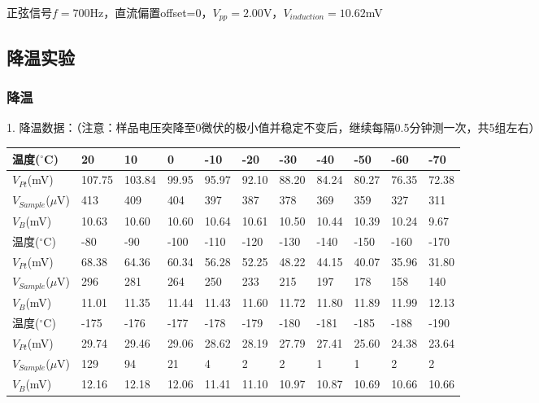 \documentclass[UTF8]{ctexart}
\begin{document}
    正弦信号$f=700$Hz，直流偏置offset=0，$V_{pp}=2.00$V，$V_{induction}=10.62$mV

    \subsection{降温实验}

    \subsubsection{降温}

    1. 降温数据：（注意：样品电压突降至0微伏的极小值并稳定不变后，继续每隔0.5分钟测一次，共5组左右）

    \begin{table}[H]
        \centering
        \begin{tabular}{|l|l|l|l|l|l|l|l|l|l|l|}
        \hline
            温度($^{\circ}$C) & 20 & 10 & 0 & -10 & -20 & -30 & -40 & -50 & -60 & -70 \\ \hline
            $V_{Pt}$(mV) & 107.75 & 103.84 & 99.95 & 95.97 & 92.10 & 88.20 & 84.24 & 80.27 & 76.35 & 72.38 \\ \hline
            $V_{Sample}$($\mu$V) & 413 & 409 & 404 & 397 & 387 & 378 & 369 & 359 & 327 & 311 \\ \hline
            $V_B$(mV) & 10.63 & 10.60 & 10.60 & 10.64 & 10.61 & 10.50 & 10.44 & 10.39 & 10.24 & 9.67 \\ \hline
            \hline
            温度($^{\circ}$C) & -80 & -90 & -100 & -110 & -120 & -130 & -140 & -150 & -160 & -170 \\ \hline
            $V_{Pt}$(mV) & 68.38 & 64.36 & 60.34 & 56.28 & 52.25 & 48.22 & 44.15 & 40.07 & 35.96 & 31.80 \\ \hline
            $V_{Sample}$($\mu$V) & 296 & 281 & 264 & 250 & 233 & 215 & 197 & 178 & 158 & 140 \\ \hline
            $V_B$(mV) & 11.01 & 11.35 & 11.44 & 11.43 & 11.60 & 11.72 & 11.80 & 11.89 & 11.99 & 12.13 \\ \hline
            \hline
            温度($^{\circ}$C) & -175 & -176 & -177 & -178 & -179 & -180 & -181 & -185 & -188 & -190 \\ \hline
            $V_{Pt}$(mV) & 29.74 & 29.46 & 29.06 & 28.62 & 28.19 & 27.79 & 27.41 & 25.60 & 24.38 & 23.64 \\ \hline
            $V_{Sample}$($\mu$V) & 129 & 94 & 21 & 4 & 2 & 2 & 1 & 1 & 2 & 2 \\ \hline
            $V_B$(mV) & 12.16 & 12.18 & 12.06 & 11.41 & 11.10 & 10.97 & 10.87 & 10.69 & 10.66 & 10.66 \\ \hline
        \end{tabular}
    \end{table}
\end{document}
